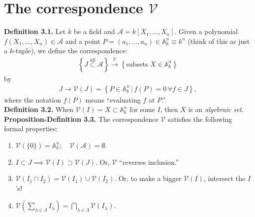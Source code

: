 \documentclass[12pt]{article}
\newcommand{\lp}{\left(}
\newcommand{\rp}{\right)}
\newcommand{\lc}{\left\{}
\newcommand{\rc}{\right\}}
\begin{document}
\newpage

\section{The correspondence $\mathcal{V}$}

\textbf{Definition 3.1.} Let $k$ be a field and $\mathcal{A} = k[X_1,\dots,X_n]$. Given a polynomial $f(X_1,\dots,X_n) \in \mathcal{A}$ and a point $P = (a_1,\dots,a_n) \in \mathbb{A}^n_{k} \equiv k^n$ (think of this as just a $k$-tuple), we define the correspondence:
\begin{align*}
\lc {J} \overset{\text{idl}}{\subset} \mathcal{A} \rc \xrightarrow{\mathcal{V}} \lc \text{subsets } X \in \mathbb{A}^n_k \rc
\end{align*}
by 
\begin{align*}
J \to \mathcal{V}(J) = \lc P\in \mathbb{A}^n_k \,\vert\, f(P) = 0\,\forall f\in {J} \rc,
\end{align*}
where the notation $f(P)$ means ``evaluating $f$ at $P$.'' \\


\noindent \textbf{Definition 3.2.} When $\mathcal{V}({I}) = X \subset \mathbb{A}^n_k$ for some ${I}$, then $X$ is an \textit{algebraic set}. \\


\noindent \textbf{Proposition-Definition 3.3.} The correspondence $\mathcal{V}$ satisfies the following formal properties:
\begin{enumerate}
	\item $\mathcal{V}(\{0\}) = \mathbb{A}^n_k; \quad \mathcal{V}(\mathcal{A}) = \emptyset$.
	\item $I \subset J \implies \mathcal{V}(I) \supset \mathcal{V}(J)$. Or, $\mathcal{V}$ ``reverses inclusion.''
	\item $\mathcal{V}(I_1 \cap I_2) = \mathcal{V}(I_1) \cup \mathcal{V}(I_2) $. Or, to make a bigger $\mathcal{V}(I)$, intersect the ${I}$'s!
	\item $\mathcal{V}\lp \sum_{\lambda\in \Lambda}I_\lambda \rp = \bigcap_{\lambda\in \Lambda} \mathcal{V}(I_\lambda)$. 
\end{enumerate}
\end{document}
